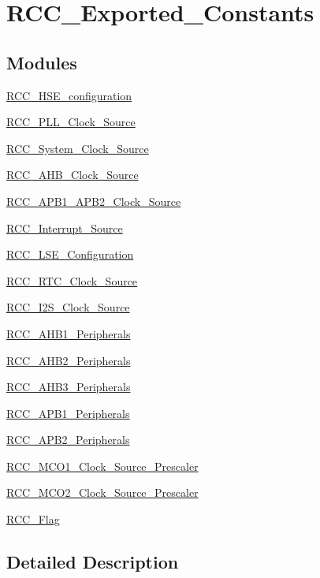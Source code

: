 \hypertarget{group___r_c_c___exported___constants}{}\section{R\+C\+C\+\_\+\+Exported\+\_\+\+Constants}
\label{group___r_c_c___exported___constants}
\subsection*{Modules}
\begin{DoxyCompactItemize}
\item 
\hyperlink{group___r_c_c___h_s_e__configuration}{R\+C\+C\+\_\+\+H\+S\+E\+\_\+configuration}
\item 
\hyperlink{group___r_c_c___p_l_l___clock___source}{R\+C\+C\+\_\+\+P\+L\+L\+\_\+\+Clock\+\_\+\+Source}
\item 
\hyperlink{group___r_c_c___system___clock___source}{R\+C\+C\+\_\+\+System\+\_\+\+Clock\+\_\+\+Source}
\item 
\hyperlink{group___r_c_c___a_h_b___clock___source}{R\+C\+C\+\_\+\+A\+H\+B\+\_\+\+Clock\+\_\+\+Source}
\item 
\hyperlink{group___r_c_c___a_p_b1___a_p_b2___clock___source}{R\+C\+C\+\_\+\+A\+P\+B1\+\_\+\+A\+P\+B2\+\_\+\+Clock\+\_\+\+Source}
\item 
\hyperlink{group___r_c_c___interrupt___source}{R\+C\+C\+\_\+\+Interrupt\+\_\+\+Source}
\item 
\hyperlink{group___r_c_c___l_s_e___configuration}{R\+C\+C\+\_\+\+L\+S\+E\+\_\+\+Configuration}
\item 
\hyperlink{group___r_c_c___r_t_c___clock___source}{R\+C\+C\+\_\+\+R\+T\+C\+\_\+\+Clock\+\_\+\+Source}
\item 
\hyperlink{group___r_c_c___i2_s___clock___source}{R\+C\+C\+\_\+\+I2\+S\+\_\+\+Clock\+\_\+\+Source}
\item 
\hyperlink{group___r_c_c___a_h_b1___peripherals}{R\+C\+C\+\_\+\+A\+H\+B1\+\_\+\+Peripherals}
\item 
\hyperlink{group___r_c_c___a_h_b2___peripherals}{R\+C\+C\+\_\+\+A\+H\+B2\+\_\+\+Peripherals}
\item 
\hyperlink{group___r_c_c___a_h_b3___peripherals}{R\+C\+C\+\_\+\+A\+H\+B3\+\_\+\+Peripherals}
\item 
\hyperlink{group___r_c_c___a_p_b1___peripherals}{R\+C\+C\+\_\+\+A\+P\+B1\+\_\+\+Peripherals}
\item 
\hyperlink{group___r_c_c___a_p_b2___peripherals}{R\+C\+C\+\_\+\+A\+P\+B2\+\_\+\+Peripherals}
\item 
\hyperlink{group___r_c_c___m_c_o1___clock___source___prescaler}{R\+C\+C\+\_\+\+M\+C\+O1\+\_\+\+Clock\+\_\+\+Source\+\_\+\+Prescaler}
\item 
\hyperlink{group___r_c_c___m_c_o2___clock___source___prescaler}{R\+C\+C\+\_\+\+M\+C\+O2\+\_\+\+Clock\+\_\+\+Source\+\_\+\+Prescaler}
\item 
\hyperlink{group___r_c_c___flag}{R\+C\+C\+\_\+\+Flag}
\end{DoxyCompactItemize}


\subsection{Detailed Description}
